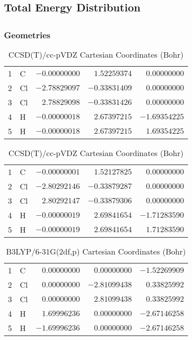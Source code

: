\documentclass[10pt,oneside]{article}
\begin{document}
\begin{table}
\subsection*{Total Energy Distribution}
\centering\end{table}

\clearpage

\subsection{}

\begin{table}[h!]
\subsubsection*{Geometries}
\begin{multicols}{2}
\centering
\caption{CCSD(T)/cc-pVTZ Cartesian Coordinates (Bohr)}
\begin{tabular}{llrrr}
\toprule
1  & C  & $-0.00000000$ & $ 1.52259374$ & $ 0.00000000$ \\
2  & Cl & $-2.78829097$ & $-0.33831409$ & $ 0.00000000$ \\
3  & Cl & $ 2.78829098$ & $-0.33831426$ & $ 0.00000000$ \\
4  & H  & $-0.00000018$ & $ 2.67397215$ & $-1.69354225$ \\
5  & H  & $-0.00000018$ & $ 2.67397215$ & $ 1.69354225$ \\
\bottomrule
\end{tabular}
\caption{CCSD(T)/cc-pVDZ Cartesian Coordinates (Bohr)}
\begin{tabular}{llrrr}
\toprule
1  & C  & $-0.00000001$ & $ 1.52127825$ & $ 0.00000000$ \\
2  & Cl & $-2.80292146$ & $-0.33879287$ & $ 0.00000000$ \\
3  & Cl & $ 2.80292147$ & $-0.33879306$ & $ 0.00000000$ \\
4  & H  & $-0.00000019$ & $ 2.69841654$ & $-1.71283590$ \\
5  & H  & $-0.00000019$ & $ 2.69841654$ & $ 1.71283590$ \\
\bottomrule
\end{tabular}
\end{multicols}
\end{table}

\begin{table}[h]
\centering
\caption{B3LYP/6-31G(2df,p) Cartesian Coordinates (Bohr)}
\begin{tabular}{llrrr}
\toprule
1  & C  & $ 0.00000000$ & $ 0.00000000$ & $-1.52269909$ \\
2  & Cl & $ 0.00000000$ & $-2.81099438$ & $ 0.33825992$ \\
3  & Cl & $ 0.00000000$ & $ 2.81099438$ & $ 0.33825992$ \\
4  & H  & $ 1.69996236$ & $ 0.00000000$ & $-2.67146258$ \\
5  & H  & $-1.69996236$ & $ 0.00000000$ & $-2.67146258$ \\
\bottomrule
\end{tabular}
\end{table}
\end{document}
